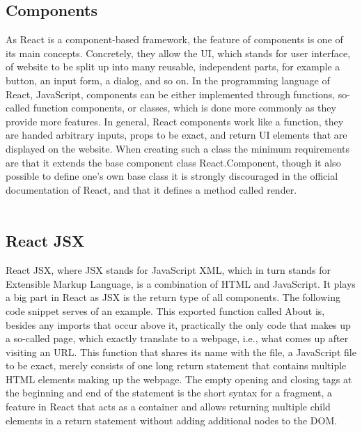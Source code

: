 \subsection{Components}
As React is a component-based framework, the feature of components is one of its main concepts. Concretely, they
allow the UI, which stands for user interface, of website to be split up into many reusable, independent parts,
for example a button, an input form, a dialog, and so on. In the programming language of React, JavaScript,
components can be either implemented through functions, so-called function components, or classes, which is done 
more commonly as they provide more features. In general, React components work like a function, they are handed 
arbitrary inputs, props to be exact, and return UI elements that are displayed on the website. When creating 
such a class the minimum requirements are that it extends the base component class React.Component, though it 
also possible to define one's own base class it is strongly discouraged in the official documentation of React,
and that it defines a method called render.
\\
\\
\subsection{React JSX}
React JSX, where JSX stands for JavaScript XML, which in turn stands for Extensible Markup Language, is a combination
of HTML and JavaScript. It plays a big part in React as JSX is the return type of all components. The following 
code snippet serves of an example.
This exported function called About is, besides any imports that occur above it, practically the only code that makes 
up a so-called page, which exactly translate to a webpage, i.e., what comes up after visiting an URL. This function 
that shares its name with the file, a JavaScript file to be exact, merely consists of one long return statement that 
contains multiple HTML elements making up the webpage. \cite{ReactJSX}
The empty opening and closing tags at the beginning and end of the statement is the short syntax for a fragment, a 
feature in React that acts as a container and allows returning multiple child elements in a return statement 
without adding additional nodes to the DOM. \cite{ReactFragments}
\\
\\
